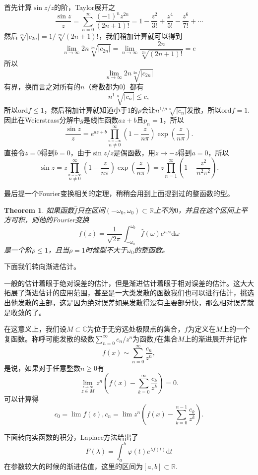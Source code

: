 \documentclass[10pt]{book}
\theoremstyle{plain}%
\newtheorem{theo}{Theorem}[chapter]%
\begin{document}
首先计算$\sin z /z$的阶，Taylor展开之
\[
\frac{\sin z}{z}= \sum_{n=0}^\infty \frac{(-1)^nz^{2n}}{(2n+1)!}= 1 - \frac{z^2}{3!} + \frac{z^4}{5!} - \frac{z^6}{7!} + \cdots 
\]
然后$\sqrt[2n]{|c_{2n}|}=1/\sqrt[2n]{(2n+1)!}$，我们稍加计算就可以得到
\[
\lim_{n\to \infty} 2n\sqrt[2n]{|c_{2n}|}=\lim_{n\to \infty} \frac{2n}{\sqrt[2n]{(2n+1)!}}=e
\]
所以\[\lim_{n\to \infty} 2n\sqrt[2n]{|c_{2n}|}\]有界，换而言之对所有的$n$（奇数都为0）都有
\[
n^{1}\sqrt[n]{|c_n|}\leq c,
\]
所以$\mathrm{ord} f\leq 1$，然后稍加计算就知道小于1的$\rho$会让$n^{1/\rho}\sqrt[n]{|c_n|}$发散，所以$\mathrm{ord} f=1$.因此在Weierstrass分解中$g$是线性函数$az+b$且$p_n=1$，所以
\[
\frac{\sin z}{z}=e^{az+b}\prod_{\stackrel{n=-\infty}{n\neq 0}}^\infty  \left(1-\frac{z}{n\pi}\right)\exp\left(\frac{z}{n\pi}\right).
\]
直接令$z=0$得到$b=0$，由于$\sin z/z$是偶函数，用$z \to -z$得到$a=0$，所以
\[
\sin z=z\prod_{\stackrel{n=-\infty}{n\neq 0}}^\infty  \left(1-\frac{z}{n\pi}\right)\exp\left(\frac{z}{n\pi}\right)=z\prod_{n=1}^\infty  \left(1-\frac{z^2}{n^2\pi^2}\right).
\]

最后提一个Fourier变换相关的定理，稍稍会用到上面提到过的整函数的型。
\begin{theo}
如果函数$\hat{f}$只在区间$(-\omega_0,\omega_0)\subset \mathbb{R}$上不为$0$，并且在这个区间上平方可积，则他的Fourier变换
\[
f(z)=\frac{1}{\sqrt{2\pi}}\int_{-\omega_0}^{\omega_0} \hat{f}(\omega)e^{i\omega z}\mathrm{d}\omega
\]
是一个阶$\rho\leq 1$，且当$\rho =1$时候型不大于$\omega_0$的整函数。
\end{theo}

下面我们转向渐进估计。

一般的估计着眼于绝对误差的估计，但是渐进估计着眼于相对误差的估计。这大大拓展了渐进估计的应用范围，甚至是一大类发散的函数我们也可以进行估计，挑选出他发散的主部，这是因为绝对误差如果发散得没有主要部分快，那么相对误差就是收敛的了。

在这意义上，我们设$M\subset \mathbb{C}$为位于无穷远处极限点的集合，$f$为定义在$M$上的一个复函数。称呼可能发散的级数$\sum_{n=0}^\infty c_n/z^n$为函数$f$在集合$M$上的渐进展开并记作
\[
f(x) \sim \sum_{n=0}^\infty \frac{c_n}{z^n},
\]
是说，如果对于任意整数$n\geq 0$有
\[
\lim_{\stackrel{z\to \infty}{z\in M}}z^n\left( f(x)-\sum_{k=0}^\infty \frac{c_k}{z^k}\right)=0.
\]
可以计算得
\[
c_0=\lim f(z), c_n=\lim z^n\left( f(x)-\sum_{k=0}^{n-1} \frac{c_k}{z^k}\right).
\]

下面转向实函数的积分，Laplace方法给出了
\[
F(\lambda)=\int_a^b \varphi(t) e^{\lambda f(t)} \mathrm{d}t
\]
在参数较大的时候的渐进估值，这里的区间为$[a,b]\subset \mathbb{R}$.
\end{document}
